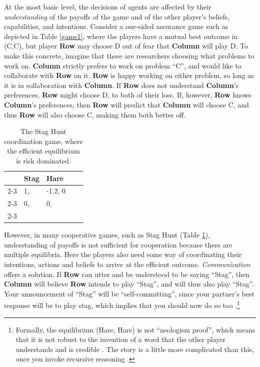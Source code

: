 \documentclass[11pt, a4paper, logo, onecolumn, nonumbering]{deepmind}
\begin{document}
At the most basic level, the decisions of agents are affected by their \textit{understanding} of the payoffs of the game and of the other player's beliefs, capabilities, and intentions. Consider a one-sided assurance game
such as depicted in Table \ref{game1}, where the players have a mutual best outcome in (C,C), but player \textbf{Row} may choose D out of fear that \textbf{Column} will play D. To make this concrete, imagine that these are researchers choosing what problems to work on. \textbf{Column} strictly prefers to work on problem ``C'', and would like to collaborate with \textbf{Row} on it. \textbf{Row} is happy working on either problem, so long as it is in collaboration with \textbf{Column}. If \textbf{Row} does not understand \textbf{Column}'s preferences, \textbf{Row} might choose D, to both of their loss. If, however, \textbf{Row} knows \textbf{Column}'s preferences, then \textbf{Row} will predict that \textbf{Column} will choose C, and thus \textbf{Row} will also choose C, making them both better off. 






\begin{table}
\begin{tabular}{lllll}
& Stag & Hare & & 
\\ \cline{2-3}
\multicolumn{1}{l|}{Stag} & \multicolumn{1}{l|}{1, \quad 1} & \multicolumn{1}{l|}{-1.2, 0} & & \\ \cline{2-3}
\multicolumn{1}{l|}{Hare} & \multicolumn{1}{l|}{0,\quad -1.2} & \multicolumn{1}{l|}{0, \quad 0} & & \\ \cline{2-3}
& & & &
\end{tabular}
\vspace{-5mm}
\caption{The Stag Hunt coordination game, where the efficient equilibrium is risk dominated.}
\label{riskdominatedcoordination}
\end{table}

However, in many cooperative games, such as Stag Hunt (Table \ref{riskdominatedcoordination}), understanding of payoffs is not sufficient for cooperation because there are multiple equilibria. Here the players also need some way of coordinating their intentions, actions and beliefs to arrive at the efficient outcome. \textit{Communication} offers a solution. If \textbf{Row} can utter and be understood to be saying ``Stag'', then \textbf{Column} will believe \textbf{Row} intends to play ``Stag'', and will thus also play ``Stag''. Your announcement of ``Stag'' will be ``self-committing'', since your partner's best response will be to play stag, which implies that you should now do so too \cite{FARRELL1988209}.\footnote{Formally, the equilibrium (Hare, Hare) is not ``neologism proof'', which means that it is not robust to the invention of a word that the other player understands and is credible \cite{farrell1993meaning}. The story is a little more complicated than this, once you invoke recursive reasoning \cite{10.2307/27871271}.}
\end{document}
